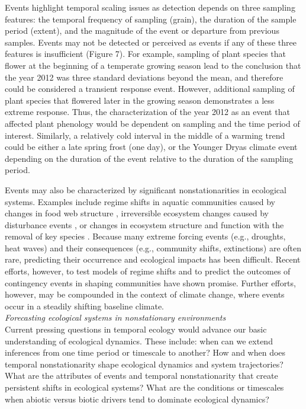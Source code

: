 \documentclass[11pt,a4paper,oneside]{article}
\begin{document}
Events highlight temporal scaling issues as detection depends on three sampling features: the temporal frequency of sampling (grain), the duration of the sample period (extent), and the magnitude of the event or departure from previous samples. Events may not be detected or perceived as events if any of these three features is insufficient (Figure 7). For example, sampling of plant species that flower at the beginning of a temperate growing season lead to the conclusion that the year 2012 was three standard deviations beyond the mean, and therefore could be considered a transient response event. However, additional sampling of plant species that flowered later in the growing season demonstrates a less extreme response. Thus, the characterization of the year 2012 as an event that affected plant phenology would be dependent on sampling and the time period of interest. Similarly, a relatively cold interval in the middle of a warming trend could be either a late spring frost (one day), or the Younger Dryas climate event \citep{Jackson:2009el} depending on the duration of the event relative to the duration of the sampling period. 

Events may also be characterized by significant nonstationarities in ecological systems. Examples include regime shifts in aquatic communities caused by changes in food web structure \citep{Carpenter2011}, irreversible ecosystem changes caused by disturbance events \citep{Allen1998}, or changes in ecosystem structure and function with the removal of key species \citep{mumby2007}. Because many extreme forcing events (e.g., droughts, heat waves) and their consequences (e.g., community shifts, extinctions) are often rare, predicting their occurrence and ecological impacts has been difficult. Recent efforts, however, to test models of regime shifts \citep{Carpenter2011,Boettiger2013} and to predict the outcomes of contingency events in shaping communities \citep{vannette2014} have shown promise. Further efforts, however, may be compounded in the context of climate change, where events occur in a steadily shifting baseline climate. \\

\noindent \emph{Forecasting ecological systems in nonstationary environments}\\
\noindent Current pressing questions in temporal ecology would advance our basic understanding of ecological dynamics. These include: when can we extend inferences from one time period or timescale to another? How and when does temporal nonstationarity shape ecological dynamics and system trajectories? What are the attributes of events and temporal nonstationarity that create persistent shifts in ecological systems? What are the conditions or timescales when abiotic versus biotic drivers tend to dominate ecological dynamics?  
\end{document}
